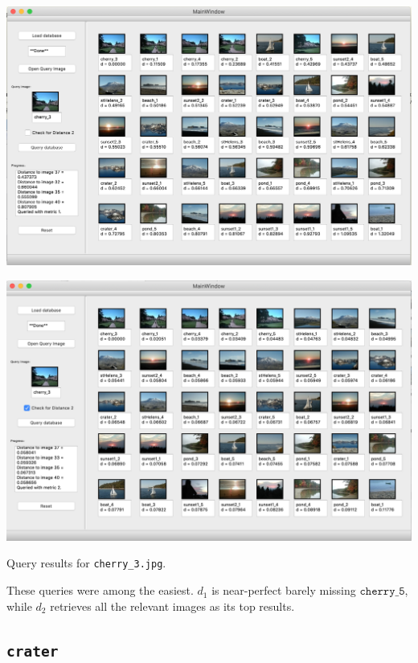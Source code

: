 \documentclass[letterpaper]{article}
\begin{document}
\begin{center}
  \includegraphics[width=\textwidth]{cherry_3_distance1.png}
  
  \includegraphics[width=\textwidth]{cherry_3_distance2.png}
  
  Query results for \texttt{cherry\_3.jpg}.
\end{center}

These queries were among the easiest. $d_1$ is near-perfect barely missing
$\texttt{cherry\_5}$, while $d_2$ retrieves all the relevant images as its top results.

\subsection{\texttt{crater}}
\end{document}
